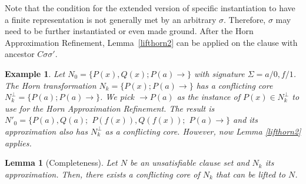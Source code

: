 \documentclass{llncs}
\newcommand{\imp}{\rightarrow}
\newtheorem{lem}[theorem]{Lemma}
\newtheorem{exmp}{Example}
\begin{document}
Note that the condition for the extended version of  specific instantiation to have a finite representation is not generally met by an arbitrary $\sigma$.
Therefore, $\sigma$ may need to be further instantiated or even made ground. 
After the Horn Approximation Refinement, Lemma~\ref{lifthorn2} can be applied on 
the clause with ancestor $C\sigma\sigma'$.

\begin{exmp}
Let $N_0 = \{ P(x),Q(x);  P(a)\imp\}$ with signature $\Sigma = a/0, f/1$. 
The Horn transformation $N_k=\{  P(x); P(a) \imp\}$ has a conflicting core 
$N^\bot_k= \{  P(a); P(a) \imp\}$.
We pick $ \imp P(a)$ as the instance of $ P(x) \in N^\bot_k$ to use for  the Horn Approximation Refinement.
The result is $N'_0=\{  P(a),Q(a);$ $ P(f(x)),Q(f(x));$ $  P(a)\imp\} $ 
and its approximation also has $N^\bot_k$ as a conflicting core.
However, now Lemma \ref{lifthorn2} applies.
\end{exmp} 



\begin{lem}[Completeness]\label{complete}
Let $N$ be an unsatisfiable clause set and $N_k$ its approximation.
Then, there exists a conflicting core of $N_k$ that can be lifted to $N$.
\end{lem}
\end{document}

